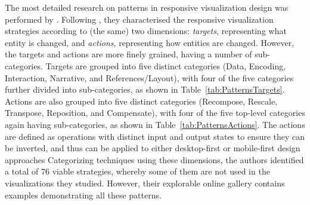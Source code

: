 The most detailed research on patterns in responsive visualization
design was performed by \textcite{DesignPatternsTradeOffsRespVis}.
Following \textcite{TechniquesForFlexibleRespVisDesign}, they
characterised the responsive visualization strategies according to
(the same) two dimensions: \emph{targets}, representing what entity is
changed, and \emph{actions}, representing how entities are changed.
However, the targets and actions are more finely grained, having a
number of sub-categories.
%
Targets are grouped into five distinct categories (Data, Encoding,
Interaction, Narrative, and References/Layout), with four of the five
categories further divided into sub-categories, as shown in
Table~\ref{tab:PatternsTargets}.
%
Actions are also grouped into five distinct categories (Recompose,
Rescale, Transpose, Reposition, and Compensate), with four of the five
top-level categories again having sub-categories, as shown in
Table~\ref{tab:PatternsActions}. The actions are defined as operations
with distinct input and output states to ensure they can be inverted,
and thus can be applied to either desktop-first or mobile-first design
approaches
%
Categorizing techniques using these dimensions, the authors identified
a total of 76 viable strategies, whereby some of them are not used in
the visualizations they studied. However, their explorable online
gallery \parencite{DesignPatternsTradeOffsRespVisGallery} contains
examples demonstrating all these patterns.





